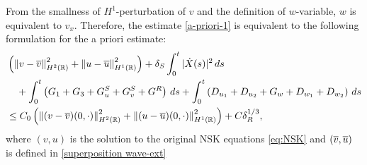\documentclass[11pt,reqno]{amsart}
\begin{document}
	\begin{remark}
		From the smallness of $H^1$-perturbation of $v$ and the definition of $w$-variable, $w$ is equivalent to $v_x$. Therefore, the estimate \eqref{a-priori-1} is equivalent to the following formulation for the a priori estimate:
		\begin{equation}
		\begin{aligned} \label{a-priori-2}
		& \left(\left\lVert v-\overline{v}\right\rVert_{H^2 (\mathbb{R})}^2 +\left\lVert u-\overline{u}\right\rVert_{H^1(\mathbb{R})}^2\right)+\delta_S \int_0^t | \dot{X}(s)|^2 \, d s \\ 
		&\quad +\int_0^t \left( G_1+G_3+G^S_u+G^S_v+G^R \right) \, ds +  \int_0^t \left( D_{u_1} + D_{u_2} + G_{w} + D_{w_1} + D_{w_2} \right)\, ds   \\ 
		& \le C_0 \left(\left\lVert(v-\overline{v})(0,\cdot)\right\rVert_{H^2 (\mathbb{R})}^2 +\left\lVert(u-\overline{u})(0,\cdot)\right\rVert_{H^1(\mathbb{R})}^2\right)+C \delta_R^{1/3},
		\end{aligned}
		\end{equation}
		where $(v,u)$ is the solution to the original NSK equations \eqref{eq:NSK} and $(\overline{v},\overline{u})$ is defined in \eqref{superposition wave-ext}
	\end{remark}
\end{document}
